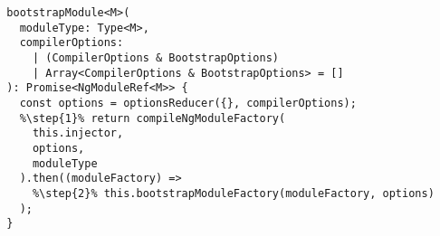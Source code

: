 \begin{verbatim}
  bootstrapModule<M>(
    moduleType: Type<M>,
    compilerOptions:
      | (CompilerOptions & BootstrapOptions)
      | Array<CompilerOptions & BootstrapOptions> = []
  ): Promise<NgModuleRef<M>> {
    const options = optionsReducer({}, compilerOptions);
    %\step{1}% return compileNgModuleFactory(
      this.injector,
      options,
      moduleType
    ).then((moduleFactory) =>
      %\step{2}% this.bootstrapModuleFactory(moduleFactory, options)
    );
  }
\end{verbatim}
